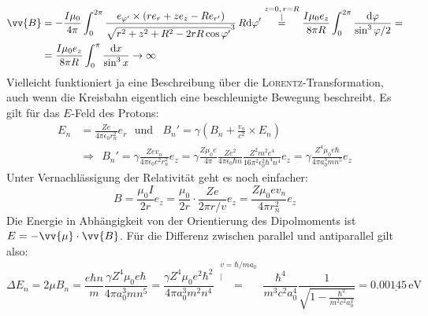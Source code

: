\documentclass[a4paper,12pt]{article}
\newcommand{\kom}{}
\begin{document}
\begin{align*}
\vv{B}&=-\frac{I\mu_0}{4\pi}\int_0^{2\pi}\frac{e_{\varphi'}\times (re_r+ze_z-Re_{r'})}{\sqrt{r^2+z^2+R^2-2rR\cos\varphi'}^3}\,R\mathrm{d}\varphi'\kom\overset{\substack{{z=0,\, r=R} \\ |}}{=}\frac{I\mu_0e_z}{8\pi R}\int_0^{2\pi}\frac{\mathrm{d}\varphi}{\sin^3\varphi/2}=\\
&=\frac{I\mu_0e_z}{8\pi R}\int_0^\pi \frac{\mathrm{d}x}{\sin^3x}\rightarrow\infty
\end{align*}
Vielleicht funktioniert ja eine Beschreibung über die \textsc{Lorentz}-Transformation, auch wenn die Kreisbahn eigentlich eine beschleunigte Bewegung beschreibt. Es gilt für das $E$-Feld des Protons:
\begin{align*}
E_n&=\frac{Ze}{4\pi\epsilon_0r_n^2}e_r\ \ \ \mathrm{und}\ \ \ \ B_n'=\gamma (B_n+\frac{v_n}{c^2}\times E_n)\\
&\Rightarrow\ \ B_n'=\gamma \frac{Zev_n}{4\pi\epsilon_0c^2r_n^2}e_z=\gamma\frac{Z\mu_0e}{4\pi}\frac{Ze^2}{4\pi\epsilon_0\hbar n}\frac{Z^2m^2e^4}{16\pi^2\epsilon_0^2\hbar^4 n^4} e_z=\gamma\frac{Z^4\mu_0e\hbar}{4\pi a_0^3m n^5}e_z
\end{align*}
Unter Vernachlässigung der Relativität geht es noch einfacher:
$$B=\frac{\mu_0I}{2r}e_z=\frac{\mu_0}{2r}\cdot\frac{Ze}{2\pi r/v}e_z=\frac{Z\mu_0ev_n}{4\pi r_n^2}e_z$$
Die Energie in Abhängigkeit von der Orientierung des Dipolmoments ist $E=-\vv{\mu}\cdot\vv{B}$. Für die Differenz zwischen parallel und antiparallel gilt also:
$$\Delta E_n =2\mu B_n=\frac{e\hbar n}{m}\frac{\gamma Z^4\mu_0e\hbar}{4\pi a_0^3mn^5}=\frac{\gamma Z^4\mu_0e^2\hbar^2}{4\pi a_0^3m^2n^4}\kom\overset{\substack{{v=\hbar /ma_0} \\ |}}{=}\frac{\hbar^4}{m^3c^2a_0^4}\frac{1}{\sqrt{1-\frac{\hbar^2}{m^2c^2a_0^2}}}=\underline{0.00145\,\mathrm{eV}}$$
\end{document}
